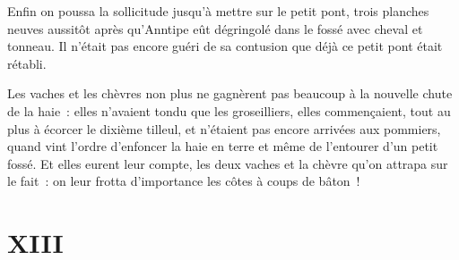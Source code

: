 \documentclass[french,twoside]{book} %
\begin{document}
Enfin on poussa la sollicitude jusqu’à mettre sur le petit pont, trois planches neuves aussitôt après qu’Anntipe eût dégringolé dans le fossé avec cheval et tonneau. Il n’était pas encore guéri de sa contusion que déjà ce petit pont était rétabli.\par
Les vaches et les chèvres non plus ne gagnèrent pas beaucoup à la nouvelle chute de la haie : elles n’avaient tondu que les groseilliers, elles commençaient, tout au plus à écorcer le dixième tilleul, et n’étaient pas encore arrivées aux pommiers, quand vint l’ordre d’enfoncer la haie en terre et même de l’entourer d’un petit fossé. Et elles eurent leur compte, les deux vaches et la chèvre qu’on attrapa sur le fait : on leur frotta d’importance les côtes à coups de bâton !
\section[{XIII}]{XIII}\renewcommand{\leftmark}{XIII}
\end{document}
